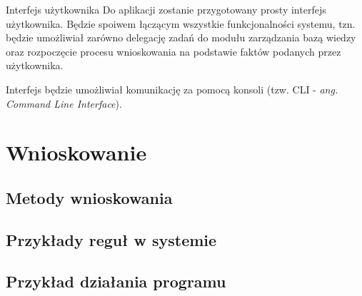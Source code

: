 \documentclass{beamer}
\begin{document}
\begin{frame}
	
	\begin{block}{Interfejs użytkownika}
		Do aplikacji zostanie przygotowany prosty interfejs użytkownika. Będzie spoiwem łączącym wszystkie funkcjonalności systemu, tzn. będzie umożliwiał zarówno delegację zadań do modułu zarządzania bazą wiedzy oraz rozpoczęcie procesu wnioskowania na podstawie faktów podanych przez użytkownika. 
		
		Interfejs będzie umożliwiał komunikację za pomocą konsoli (tzw. CLI - \textit{ang. Command Line Interface}).
	\end{block}

\end{frame}

\section{Wnioskowanie}

\subsection{Metody wnioskowania}

\begin{frame}

\end{frame}

\subsection{Przykłady reguł w systemie}

\begin{frame}

\end{frame}

\subsection{Przykład działania programu}

\begin{frame}

\end{frame} 
\end{document}
